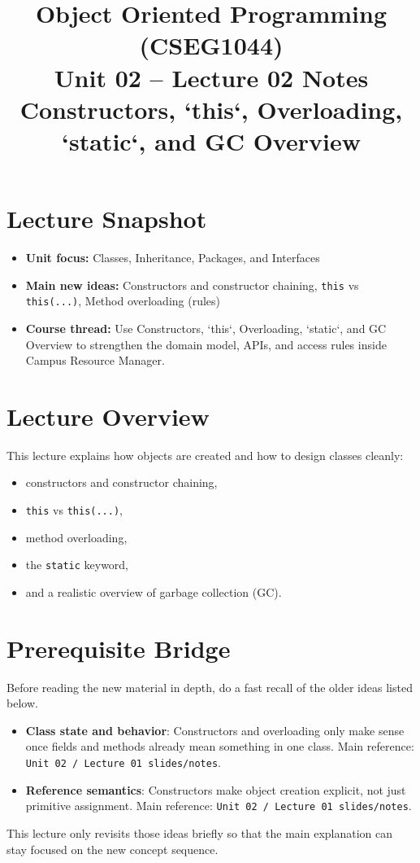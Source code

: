\documentclass[11pt]{article}
\title{Object Oriented Programming (CSEG1044)\\Unit 02 -- Lecture 02 Notes\\Constructors, `this`, Overloading, `static`, and GC Overview}
\begin{document}
\maketitle
\tableofcontents

\section{Lecture Snapshot}
\begin{itemize}
  \item \textbf{Unit focus:} Classes, Inheritance, Packages, and Interfaces
  \item \textbf{Main new ideas:} Constructors and constructor chaining, \texttt{this} vs \texttt{this(...)}, Method overloading (rules)
  \item \textbf{Course thread:} Use Constructors, `this`, Overloading, `static`, and GC Overview to strengthen the domain model, APIs, and access rules inside Campus Resource Manager.
\end{itemize}
\notesources{\OOPSUnitIISources}

\section{Lecture Overview}
This lecture explains how objects are created and how to design classes cleanly:
\begin{itemize}
  \item constructors and constructor chaining,
  \item \texttt{this} vs \texttt{this(...)},
  \item method overloading,
  \item the \texttt{static} keyword,
  \item and a realistic overview of garbage collection (GC).
\end{itemize}
\notesources{\OOPSUnitIISources}

\section{Prerequisite Bridge}
Before reading the new material in depth, do a fast recall of the older ideas listed below.
\begin{itemize}
  \item \textbf{Class state and behavior}: Constructors and overloading only make sense once fields and methods already mean something in one class. Main reference: \texttt{Unit 02 / Lecture 01 slides/notes}.
  \item \textbf{Reference semantics}: Constructors make object creation explicit, not just primitive assignment. Main reference: \texttt{Unit 02 / Lecture 01 slides/notes}.
\end{itemize}
This lecture only revisits those ideas briefly so that the main explanation can stay focused on the new concept sequence.
\notesources{\OOPSUnitIISources}
\end{document}
